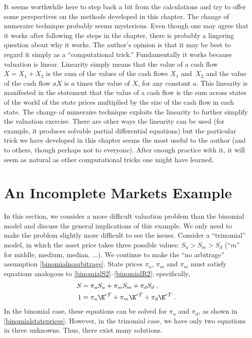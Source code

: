 It seems worthwhile here to step back a bit from the calculations and try to offer some perspectives on the methods developed in this chapter.  The change of numeraire technique probably seems mysterious.  Even though one may agree that it works after following the steps in the chapter, there is probably a lingering question about why it works.  The author's opinion is that it may be best to regard it simply as a ``computational trick.''  Fundamentally it works because valuation is linear.  Linearity simply means that the value of a cash flow $X=X_1+X_2$ is the sum of the values of the cash flows $X_1$ and~$X_2$ and the value of the cash flow $aX$ is $a$ times the value of $X$, for any constant $a$.  This linearity is manifested in the statement that the value of a cash flow is the sum across states of the world of the state prices multiplied by the size of the cash flow in each state.  The change of numeraire technique exploits the linearity to further simplify the valuation exercise.  There are other ways the linearity can be used (for example, it produces solvable partial differential equations) but the particular trick we have developed in this chapter seems the most useful to the author (and to others, though perhaps not to everyone).  After enough practice with it, it will seem as natural as other computational tricks one might have learned.

\section{An Incomplete Markets Example}\label{s_incomplete}

In this section, we consider a more difficult valuation problem than the binomial model and discuss the general implications of this example.  We only need to make the problem slightly more difficult to see the issues.  Consider a ``trinomial'' model,  in which the asset price takes three possible values: $S_u > S_m > S_d$ (``$m$'' for middle, medium, median, ...).   We continue to make the ``no arbitrage'' assumption \eqref{binomialnoarbitrage}.  State prices $\pi_u$, $\pi_m$ and $\pi_m$ must satisfy equations analogous to \eqref{binomialS2}--\eqref{binomialR2}; specifically,
\begin{subequations}\label{binomialSR10combined}
\begin{align}
S &= \pi_uS_u+\pi_mS_m+\pi_dS_d\;,\label{binomialS10}\\
1 &= \pi_u\E^{rT} + \pi_m\E^{rT} +\pi_d \E^{rT}\;.\label{binomialR10}
\end{align}\end{subequations}
In the binomial case, these equations can be solved for $\pi_u$ and $\pi_d$, as shown in \eqref{binomialstateprices}.  However, in the trinomial case, we have only two equations in three unknowns.  Thus, there exist many solutions.

